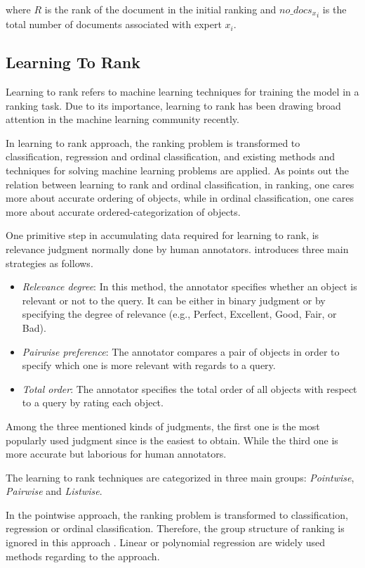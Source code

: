 \noindent 
where $R$ is the rank of the document in the initial ranking and ${no\_docs_x}_i$ is the total number of documents associated with expert $x_i$.

\subsection{Learning To Rank}
Learning to rank refers to machine learning techniques for training the model in a ranking task. Due to its importance, learning to rank has been drawing broad attention in the machine learning community recently. 

In learning to rank approach, the ranking problem is transformed to classification, regression and ordinal classification, and existing methods and techniques for solving machine learning problems are applied. As \citet{l2r-intro} points out the relation between learning to rank and ordinal classification, in ranking, one cares more about accurate ordering of objects, while in ordinal classification, one cares more about accurate ordered-categorization of objects.

One primitive step in accumulating data required for learning to rank, is relevance judgment normally done by human annotators. \citet{l2r-book} introduces three main strategies as follows.
\begin{itemize}
\item \textit{Relevance degree}: In this method, the annotator specifies whether an object is relevant or not to the query. It can be either in binary judgment or by specifying the degree of relevance (e.g., Perfect, Excellent, Good, Fair, or Bad).
\item \textit{Pairwise preference}: The annotator compares a pair of objects in order to specify which one is more relevant with regards to a query.
\item \textit{Total order}: The annotator specifies the total order of all objects with respect to a query by rating each object.
\end{itemize}

Among the three mentioned kinds of judgments, the first one is the most popularly used judgment since is the easiest to obtain. While the third one is more accurate but laborious for human annotators.

The learning to rank techniques are categorized in three main groups: \textit{Pointwise}, \textit{Pairwise} and \textit{Listwise}.

In the pointwise approach, the ranking problem is transformed to classification, regression or ordinal classification. Therefore, the group structure of ranking is ignored in this approach \citep{l2r-intro}. Linear or polynomial regression are widely used methods regarding to the approach.

